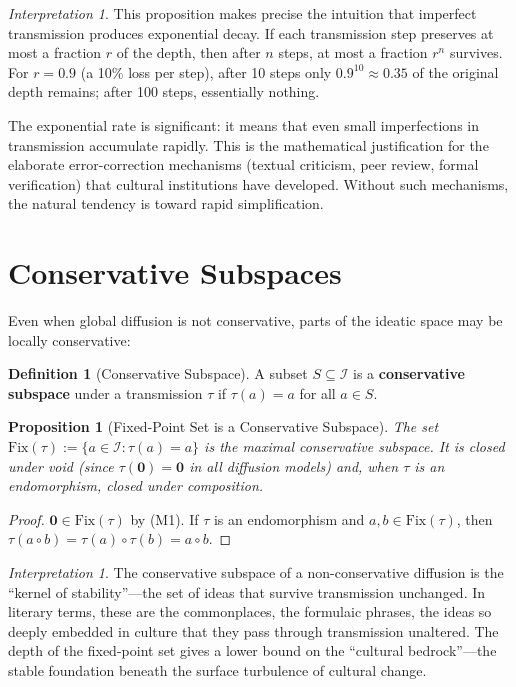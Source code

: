 \documentclass[11pt,openany]{book}
\theoremstyle{definition}
\newtheorem{definition}[axiom]{Definition}
\theoremstyle{plain}
\newtheorem{proposition}[axiom]{Proposition}
\theoremstyle{remark}
\newtheorem{interpretation}[axiom]{Interpretation}
\newcommand{\IS}{\mathcal{I}}               %
\newcommand{\compose}{\circ}                 %
\newcommand{\void}{\mathbf{0}}              %
\newcommand{\transmit}{\tau}                 %
\begin{document}
\begin{interpretation}
This proposition makes precise the intuition that imperfect transmission produces exponential decay. If each transmission step preserves at most a fraction $r$ of the depth, then after $n$ steps, at most a fraction $r^n$ survives. For $r = 0.9$ (a 10\% loss per step), after 10 steps only $0.9^{10} \approx 0.35$ of the original depth remains; after 100 steps, essentially nothing.

The exponential rate is significant: it means that even small imperfections in transmission accumulate rapidly. This is the mathematical justification for the elaborate error-correction mechanisms (textual criticism, peer review, formal verification) that cultural institutions have developed. Without such mechanisms, the natural tendency is toward rapid simplification.
\end{interpretation}

\section{Conservative Subspaces}

Even when global diffusion is not conservative, parts of the ideatic space may be locally conservative:

\begin{definition}[Conservative Subspace]
A subset $S \subseteq \IS$ is a \textbf{conservative subspace} under a transmission $\transmit$ if $\transmit(a) = a$ for all $a \in S$.
\end{definition}

\begin{proposition}[Fixed-Point Set is a Conservative Subspace]
The set $\mathrm{Fix}(\transmit) := \{a \in \IS : \transmit(a) = a\}$ is the maximal conservative subspace. It is closed under void (since $\transmit(\void) = \void$ in all diffusion models) and, when $\transmit$ is an endomorphism, closed under composition.
\end{proposition}

\begin{proof}
$\void \in \mathrm{Fix}(\transmit)$ by (M1). If $\transmit$ is an endomorphism and $a, b \in \mathrm{Fix}(\transmit)$, then $\transmit(a \compose b) = \transmit(a) \compose \transmit(b) = a \compose b$.
\end{proof}

\begin{interpretation}
The conservative subspace of a non-conservative diffusion is the ``kernel of stability''---the set of ideas that survive transmission unchanged. In literary terms, these are the commonplaces, the formulaic phrases, the ideas so deeply embedded in culture that they pass through transmission unaltered. The depth of the fixed-point set gives a lower bound on the ``cultural bedrock''---the stable foundation beneath the surface turbulence of cultural change.
\end{interpretation}
\end{document}
